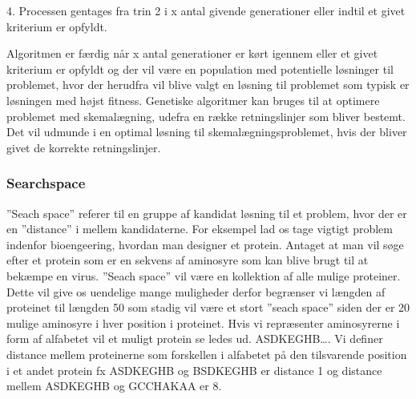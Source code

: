 4.	Processen gentages fra trin 2 i x antal givende generationer eller indtil et givet kriterium er opfyldt.


Algoritmen er færdig når x antal generationer er kørt igennem eller et givet kriterium er opfyldt og der vil være en population med potentielle løsninger til problemet, hvor der herudfra vil blive valgt en løsning til problemet som typisk er løsningen med højst fitness. Genetiske algoritmer kan bruges til at optimere problemet med skemalægning, udefra en række retningslinjer som bliver bestemt. Det vil udmunde i en optimal løsning til skemalægningsproblemet, hvis der bliver givet de korrekte retningslinjer.

\subsubsection{Searchspace}

”Seach space” referer til en gruppe af kandidat løsning til et problem, hvor der er en ”distance” i mellem kandidaterne. For eksempel lad os tage vigtigt problem indenfor bioengeering, hvordan man designer et protein. Antaget at man vil søge efter et protein som er en sekvens af aminosyre som kan blive brugt til at bekæmpe en virus. ”Seach space” vil være en kollektion af alle mulige proteiner. Dette vil give os uendelige mange muligheder derfor begrænser vi længden af proteinet til længden 50 som stadig vil være et stort ”seach space” siden der er 20 mulige aminosyre i hver position i proteinet. Hvis vi repræsenter aminosyrerne i form af alfabetet vil et muligt protein se ledes ud. 
ASDKEGHB…. Vi definer distance mellem proteinerne som forskellen i alfabetet på den tilsvarende position i et andet protein fx ASDKEGHB og BSDKEGHB er distance 1 og distance mellem ASDKEGHB og GCCHAKAA er 8.
